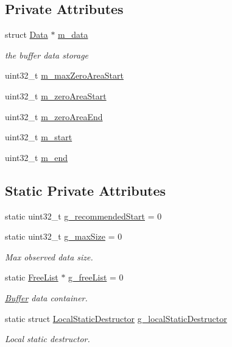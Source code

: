 \subsection*{Private Attributes}
\begin{DoxyCompactItemize}
\item 
struct \hyperlink{structns3_1_1Buffer_1_1Data}{Data} $\ast$ \hyperlink{classns3_1_1Buffer_aad1ff41b0403829d7aadfef80783484d}{m\+\_\+data}
\begin{DoxyCompactList}\small\item\em the buffer data storage \end{DoxyCompactList}\item 
uint32\+\_\+t \hyperlink{classns3_1_1Buffer_a5dd43f19f0e7d518b0fbd677e322f2cb}{m\+\_\+max\+Zero\+Area\+Start}
\item 
uint32\+\_\+t \hyperlink{classns3_1_1Buffer_ae2ebe054c3e7e2ecdfd7fcb318bf085c}{m\+\_\+zero\+Area\+Start}
\item 
uint32\+\_\+t \hyperlink{classns3_1_1Buffer_a50eb9a6ce5a2a75c25718edb92b8fdc0}{m\+\_\+zero\+Area\+End}
\item 
uint32\+\_\+t \hyperlink{classns3_1_1Buffer_afbea962435250b6a0a6c860c50b75386}{m\+\_\+start}
\item 
uint32\+\_\+t \hyperlink{classns3_1_1Buffer_a1f83bdf72c64ddd2a2e862b64236f29d}{m\+\_\+end}
\end{DoxyCompactItemize}
\subsection*{Static Private Attributes}
\begin{DoxyCompactItemize}
\item 
static uint32\+\_\+t \hyperlink{classns3_1_1Buffer_a62e14b22a57661cd7e026fea1c79db9e}{g\+\_\+recommended\+Start} = 0
\item 
static uint32\+\_\+t \hyperlink{classns3_1_1Buffer_a35a9e69b40e97421985973d1a48aab5a}{g\+\_\+max\+Size} = 0
\begin{DoxyCompactList}\small\item\em Max observed data size. \end{DoxyCompactList}\item 
static \hyperlink{classns3_1_1Buffer_a5438e49e26e30d5a54940cf5118078fd}{Free\+List} $\ast$ \hyperlink{classns3_1_1Buffer_a2d52975c7aad897af5a953a854906582}{g\+\_\+free\+List} = 0
\begin{DoxyCompactList}\small\item\em \hyperlink{classns3_1_1Buffer}{Buffer} data container. \end{DoxyCompactList}\item 
static struct \hyperlink{structns3_1_1Buffer_1_1LocalStaticDestructor}{Local\+Static\+Destructor} \hyperlink{classns3_1_1Buffer_a42a32bf7da525c42762fa737585e8c81}{g\+\_\+local\+Static\+Destructor}
\begin{DoxyCompactList}\small\item\em Local static destructor. \end{DoxyCompactList}\end{DoxyCompactItemize}


